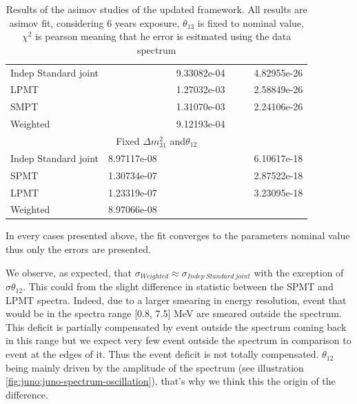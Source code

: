 \documentclass[../main.tex]{subfiles}
\begin{document}
\begin{table}[ht]
\begin{footnotesize}
\begin{tabular}{l | c | c | c | c | c | c }
  \hline
  Indep Standard joint &               &               & 9.33082e-04   &               &               & 4.82955e-26 \\
  LPMT                 &               &               & 1.27032e-03   &               &               & 2.58849e-26 \\
  SMPT                 &               &               & 1.31070e-03   &               &               & 2.24106e-26 \\
  Weighted             &               &               & 9.12193e-04   &               &               & \\
  \hline
  \hline
  \multicolumn{7}{c}{Fixed $\Delta m^2_{31}$ and$\theta_{12}$} \\
  \hline
  Indep Standard joint          & 8.97117e-08   &               &               &               &               & 6.10617e-18 \\
  SPMT                          & 1.30734e-07   &               &               &               &               & 2.87522e-18 \\
  LPMT                          & 1.23319e-07   &               &               &               &               & 3.23095e-18 \\
  Weighted                      & 8.97066e-08   &               &               &               &               & \\
  \end{tabular}
  \end{footnotesize}
  \caption{Results of the asimov studies of the updated framework. All results are asimov fit, considering 6 years exposure, $\theta_{13}$ is fixed to nominal value, $\chi^2$ is pearson meaning that he error is esitmated using the data spectrum}
  \label{tab:joint_fit:asimov_results}

\end{table}

In every cases presented above, the fit converges to the parameters nominal value thus only the errors are presented.

We observe, as expected, that $\sigma_{Weighted} \approx \sigma_{Indep~Standard~joint}$ with the exception of $\sigma \theta_{12}$. This could from the slight difference in statistic between the SPMT and LPMT spectra. Indeed, due to a larger smearing in energy resolution, event that would be in the spectra range [0.8, 7.5] MeV are smeared outside the spectrum. This deficit is partially compensated by event outside the spectrum coming back in this range but we expect very few event outside the spectrum in comparison to event at the edges of it. Thus the event deficit is not totally compensated. $\theta_{12}$ being mainly driven by the amplitude of the spectrum (see illustration \ref{fig:juno:juno-spectrum-oscillation}), that's why we think this the origin of the difference.
\end{document}
